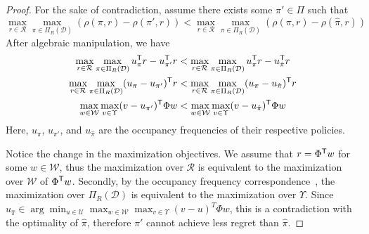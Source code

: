 \documentclass[10pt]{article}
\renewcommand{\cite}{\citep}
\begin{document}
\chebeyshevRegret*
\begin{proof}
	For the sake of contradiction,
	assume there exists some $\pi' \in \Pi$ such that
	\[
		\max_{r\in \mathcal{R}} \max_{\pi \in \Pi_{R}(\mathcal{D})}
		\left(\rho(\pi,r) - \rho(\pi', r)\right) < \max_{r\in \mathcal{R}}
		\max_{\pi \in \Pi_{R}(\mathcal{D})}
		\left(\rho(\pi, r) - \rho(\hat{\pi}, r)\right)
	\]
	After algebraic manipulation, we have
	\begin{align*}
		\max_{r\in \mathcal{R}} \max_{\pi \in \Pi_{R}
			(\mathcal{D})} u_{\pi}^{\mathsf{T}} r - u_{\pi'}^{\mathsf{T}} r
		 & < \max_{r\in \mathcal{R}}
		\max_{\pi \in \Pi_{R}
			(\mathcal{D})} u_{\pi}^{\mathsf{T}} r - u_{\hat{\pi}}
		^{\mathsf{T}} r                                              \\
		\max_{r\in \mathcal{R}} \max_{\pi \in \Pi_{R}(\mathcal{D})}
		(u_{\pi} - u_{\pi'})^{\mathsf{T}} r
		 & < \max_{r\in \mathcal{R}}
		\max_{\pi \in \Pi_{R}(\mathcal{D})}
		(u_{\pi} - u_{\hat{\pi}})^{\mathsf{T}} r
		\\
		\max_{w\in \mathcal{W}} \max_{v \in \Upsilon} (v - u_{\pi'})^{\mathsf{T}} \Phi w
		 & < \max_{w\in \mathcal{W}} \max_{v \in \Upsilon}
		(v - u_{\hat{\pi}})^{\mathsf{T}} \Phi w
	\end{align*}
	Here, $u_{\pi}$, $u_{\pi'}$, and $u_{\hat{\pi}}$
	are the occupancy frequencies of their respective policies.

	Notice the change in the maximization objectives.
	We assume that $r = \Phi^{\mathsf{T}} w$ for some $w \in \mathcal{W}$,
	thus the maximization over $\mathcal{R}$ is equivalent to the maximization
	over $\mathcal{W}$ of $\Phi^{\mathsf{T}} w$.
	Secondly, by the occupancy frequency correspondence~\cite{Puterman1994}, the
	maximization over $\Pi_R(\mathcal{D})$ is equivalent to the maximization over
	$\Upsilon$.
	Since $u_{\hat{\pi}} \in \arg\min_{u \in \mathcal{U}} \max_{w \in \mathcal{W}} \max_{v \in \Upsilon} {(v - u)}^T \Phi w$,
	this is a contradiction with the optimality of $\hat{\pi}$,
	therefore $\pi'$ cannot achieve less regret than $\hat{\pi}$.
\end{proof}
\end{document}

